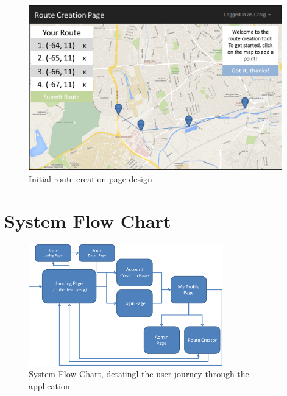 \documentclass[a4paper,twoside,notitlepage,11pt]{article}
\begin{document}
\begin{figure}[!ht]
	\begin{center}
			\includegraphics[width=0.98\textwidth]{images/ui-rcp-1.png}
	\end{center}
	\vspace{-6mm}
	\caption{Initial route creation page design}
\end{figure}


\newpage 
\section{System Flow Chart}
\label{app-sfc}
 \begin{figure}[!ht]
 	\begin{center}
 		\includegraphics[width=0.75\textwidth]{images/flow.png}
 	\end{center}
 	\caption{System Flow Chart, detaiingl the user journey through the application}
 \end{figure}
\end{document}
